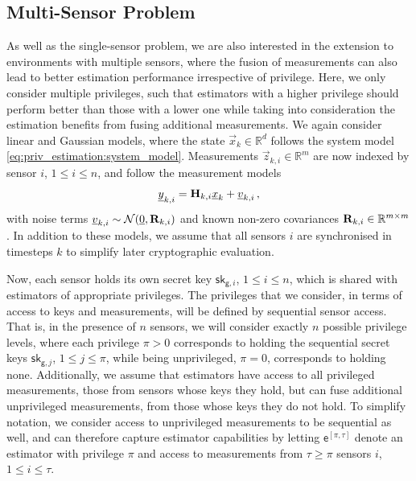 \subsection{Multi-Sensor Problem}\label{subsec:priv_estimation:fusion_problem}
As well as the single-sensor problem, we are also interested in the extension to environments with multiple sensors, where the fusion of measurements can also lead to better estimation performance irrespective of privilege. Here, we only consider multiple privileges, such that estimators with a higher privilege should perform better than those with a lower one while taking into consideration the estimation benefits from fusing additional measurements. We again consider linear and Gaussian models, where the state $\vec{x}_k \in \mathbb{R}^d$ follows the system model \eqref{eq:priv_estimation:system_model}. Measurements $\vec{z}_{k,i} \in \mathbb{R}^m$ are now indexed by sensor $i$, $1\leq i\leq n$, and follow the measurement models
\begin{equation}\label{eq:priv_estimation:multi_sensor_measurement_models}
    {\underline{y}}_{k,i} = {{\mathbf{H}}}_{k,i} {\underline{x}}_k + {\underline{v}}_{k,i}\,,
\end{equation}
with noise terms ${\underline{v}}_{k,i} \sim \mathcal{N}({\underline{0}},{{\mathbf{R}}}_{k,i})$ and known non-zero covariances ${{\mathbf{R}}}_{k,i} \in \mathbb{R}^{m \times m}$. In addition to these models, we assume that all sensors $i$ are synchronised in timesteps $k$ to simplify later cryptographic evaluation.

Now, each sensor holds its own secret key $\mathsf{sk}_{\mathsf{g}, i}$, $1\leq i\leq n$, which is shared with estimators of appropriate privileges. The privileges that we consider, in terms of access to keys and measurements, will be defined by sequential sensor access. That is, in the presence of $n$ sensors, we will consider exactly $n$ possible privilege levels, where each privilege $\pi>0$ corresponds to holding the sequential secret keys $\mathsf{sk}_{\mathsf{g},j}$, $1\leq j\leq \pi$, while being unprivileged, $\pi=0$, corresponds to holding none. Additionally, we assume that estimators have access to all privileged measurements, those from sensors whose keys they hold, but can fuse additional unprivileged measurements, from those whose keys they do not hold. To simplify notation, we consider access to unprivileged measurements to be sequential as well, and can therefore capture estimator capabilities by letting $\mathsf{e}^{[\pi,\tau]}$ denote an estimator with privilege $\pi$ and access to measurements from $\tau\geq\pi$ sensors $i$, $1\leq i\leq \tau$.

